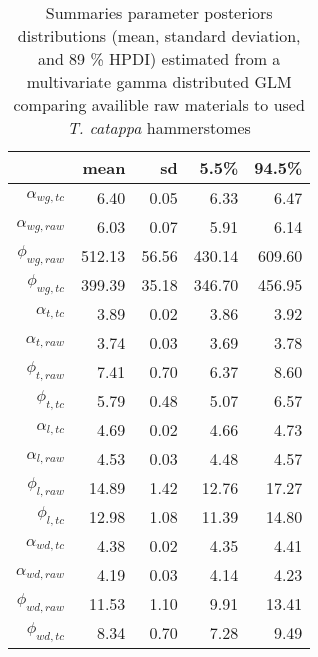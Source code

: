 \begin{table}[ht]
\centering
\begin{tabular}{rrrrr}
  \hline
 & mean & sd & 5.5\% & 94.5\% \\ 
  \hline
$\alpha_{wg,tc}$ & 6.40 & 0.05 & 6.33 & 6.47 \\ 
  $\alpha_{wg,raw}$ & 6.03 & 0.07 & 5.91 & 6.14 \\ 
  $\phi_{wg,raw}$ & 512.13 & 56.56 & 430.14 & 609.60 \\ 
  $\phi_{wg,tc}$ & 399.39 & 35.18 & 346.70 & 456.95 \\ 
  $\alpha_{t,tc}$ & 3.89 & 0.02 & 3.86 & 3.92 \\ 
  $\alpha_{t,raw}$ & 3.74 & 0.03 & 3.69 & 3.78 \\ 
  $\phi_{t,raw}$ & 7.41 & 0.70 & 6.37 & 8.60 \\ 
  $\phi_{t,tc}$ & 5.79 & 0.48 & 5.07 & 6.57 \\ 
  $\alpha_{l,tc}$ & 4.69 & 0.02 & 4.66 & 4.73 \\ 
  $\alpha_{l,raw}$ & 4.53 & 0.03 & 4.48 & 4.57 \\ 
  $\phi_{l,raw}$ & 14.89 & 1.42 & 12.76 & 17.27 \\ 
  $\phi_{l,tc}$ & 12.98 & 1.08 & 11.39 & 14.80 \\ 
  $\alpha_{wd,tc}$ & 4.38 & 0.02 & 4.35 & 4.41 \\ 
  $\alpha_{wd,raw}$ & 4.19 & 0.03 & 4.14 & 4.23 \\ 
  $\phi_{wd,raw}$ & 11.53 & 1.10 & 9.91 & 13.41 \\ 
  $\phi_{wd,tc}$ & 8.34 & 0.70 & 7.28 & 9.49 \\ 
   \hline
\end{tabular}
\caption{Summaries parameter posteriors distributions
               (mean, standard deviation, and 89 \% HPDI) estimated from a multivariate 
               gamma distributed GLM comparing availible raw materials to used 
              \textit{T. catappa} hammerstomes} 
\label{tab:model_sum_raw_dims}
\end{table}
